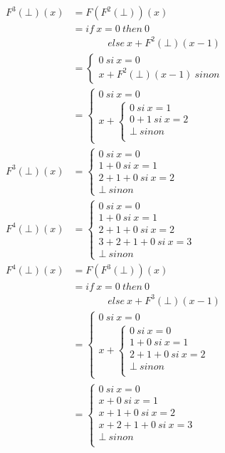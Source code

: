 \documentclass[11pt,a4paper]{article}
\begin{document}
	\begin{align*}
		F^3(\bot)(x) &= F(F^2(\bot))(x)\\
		&= if\ x = 0\ then\ 0\\
		&\ \ \ \ \ \ \ \ \ \ \ \ \ \ \ \ else\ x + F^2(\bot)(x - 1)\\
		&=	\begin{cases}
				0\ si\ x = 0\\
				x + F^2(\bot)(x - 1)\ sinon
			\end{cases}\\
		&=	\begin{cases}
				0\ si\ x = 0\\
				x + \begin{cases}
						0\ si\ x = 1\\
						0 + 1\ si\ x = 2\\
						\bot \ sinon\\
					\end{cases}
			\end{cases}\\
		F^3(\bot)(x) &=	\begin{cases}
							0\ si\ x = 0\\
							1 + 0\ si\ x = 1\\
							2 + 1 + 0\ si\ x = 2\\
							\bot\ sinon
						\end{cases}\\	
		F^4(\bot)(x) &=	\begin{cases}
							0\ si\ x = 0\\
							1 + 0\ si\ x = 1\\
							2 + 1 + 0\ si\ x = 2\\
							3 + 2 + 1 + 0\ si\ x = 3\\
							\bot\ sinon
						\end{cases}\\	
		F^4(\bot)(x) &= F(F^3(\bot))(x)\\
		&= if\ x = 0\ then\ 0\\
		&\ \ \ \ \ \ \ \ \ \ \ \ \ \ \ \ else\ x + F^3(\bot)(x - 1)\\
		&=	\begin{cases}
				0\ si\ x = 0\\
				x + \begin{cases}
						0\ si\ x = 0\\
						1 + 0\ si\ x = 1\\
						2 + 1 + 0\ si\ x = 2\\
						\bot\ sinon\\
					\end{cases}
			\end{cases}\\
		&=	\begin{cases}
				0\ si\ x = 0\\
				x + 0\ si\ x = 1\\
				x + 1 + 0\ si\ x = 2\\
				x + 2 + 1 + 0\ si\ x = 3\\
				\bot\ sinon\\
			\end{cases}\\
	\end{align*}
\end{document}
